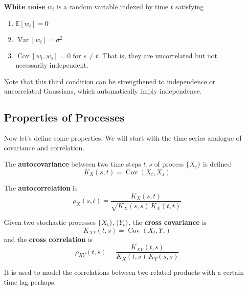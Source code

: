 \documentclass{article}
\DeclareMathOperator{\Cov}{Cov}
\DeclareMathOperator{\Var}{Var}
\begin{document}
    \begin{definition}
      \textbf{White noise} $w_t$ is a random variable indexed by time $t$ satisfying 
      \begin{enumerate}
        \item $\mathbb{E}[w_t] = 0$
        \item $\Var[w_t] = \sigma^2$
        \item $\Cov[w_t, w_s] = 0$ for $s \neq t$. That is, they are uncorrelated but not necessarily independent. 
      \end{enumerate}
      Note that this third condition can be strengthened to independence or uncorrelated Gaussians, which automatically imply independence. 
    \end{definition}

  \subsection{Properties of Processes}

    Now let's define some properties. We will start with the time series analogue of covariance and correlation. 

    \begin{definition}[Autocovariance]
      The \textbf{autocovariance} between two time steps $t, s$ of process $\{X_t\}$ is defined 
      \begin{equation}
        K_X (s, t) = \Cov(X_t, X_s)
      \end{equation}
    \end{definition}

    \begin{definition}[Autocorrelation]
      The \textbf{autocorrelation} is 
      \begin{equation}
        \rho_X (s, t) = \frac{K_X (s, t)}{\sqrt{K_X (s, s) \, K_X (t, t)}}
      \end{equation}
    \end{definition}

    \begin{definition}
      Given two stochastic processes $\{X_t\}, \{Y_t\}$, the \textbf{cross covariance} is 
      \begin{equation}
        K_{XY} (t, s) = \Cov(X_t, Y_s)
      \end{equation}
      and the \textbf{cross correlation} is 
      \begin{equation}
        \rho_{XY} (t, s) = \frac{K_{XY}(t, s)}{K_X (t, s) \, K_Y(s, s)}
      \end{equation}

      It is used to model the correlations between two related products with a certain time lag perhaps.  
    \end{definition}
\end{document}
